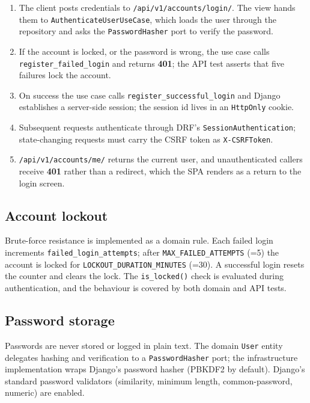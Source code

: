 \documentclass[11pt,a4paper]{article}
\begin{document}
\begin{enumerate}[leftmargin=1.4em]
  \item The client posts credentials to \texttt{/api/v1/accounts/login/}. The view hands them to
  \texttt{AuthenticateUserUseCase}, which loads the user through the repository and asks the
  \texttt{PasswordHasher} port to verify the password.
  \item If the account is locked, or the password is wrong, the use case calls
  \texttt{register\_failed\_login} and returns \textbf{401}; the API test asserts that five failures
  lock the account.
  \item On success the use case calls \texttt{register\_successful\_login} and Django establishes a
  server-side session; the session id lives in an \texttt{HttpOnly} cookie.
  \item Subsequent requests authenticate through DRF's \texttt{SessionAuthentication}; state-changing
  requests must carry the CSRF token as \texttt{X-CSRFToken}.
  \item \texttt{/api/v1/accounts/me/} returns the current user, and unauthenticated callers receive
  \textbf{401} rather than a redirect, which the SPA renders as a return to the login screen.
\end{enumerate}

\subsection{Account lockout}

Brute-force resistance is implemented as a domain rule. Each failed login increments
\texttt{failed\_login\_attempts}; after \texttt{MAX\_FAILED\_ATTEMPTS} (=5) the account is locked for
\texttt{LOCKOUT\_DURATION\_MINUTES} (=30). A successful login resets the counter and clears the lock.
The \texttt{is\_locked()} check is evaluated during authentication, and the behaviour is covered by
both domain and API tests.

\subsection{Password storage}

Passwords are never stored or logged in plain text. The domain \texttt{User} entity delegates hashing
and verification to a \texttt{PasswordHasher} port; the infrastructure implementation wraps Django's
password hasher (PBKDF2 by default). Django's standard password validators (similarity, minimum
length, common-password, numeric) are enabled.
\end{document}
